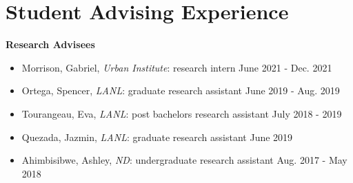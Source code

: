 \documentclass[11pt, letterpaper, roman]{moderncv} %
\begin{document}
\vspace{-15pt}
\section{Student Advising Experience}

\textbf{Research Advisees}

    \begin{itemize}
        \item Morrison, Gabriel, \textit{Urban Institute}: research intern \hfill June 2021 - Dec. 2021
        \item Ortega, Spencer, \textit{LANL}: graduate research assistant \hfill June 2019 - Aug. 2019
        \item Tourangeau, Eva, \textit{LANL}: post bachelors research assistant \hfill July 2018 - 2019
        \item Quezada, Jazmin, \textit{LANL}: graduate research assistant \hfill June 2019
        \item Ahimbisibwe, Ashley, \textit{ND}: undergraduate research assistant \hfill Aug. 2017 - May 2018
    \end{itemize}
\end{document}
